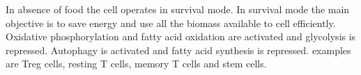 In absence of food the cell operates in survival mode. In survival mode the main objective is to save energy and use all the biomass available to cell efficiently.
Oxidative phosphorylation and fatty acid oxidation are activated and glycolysis is repressed.
Autophagy is activated and fatty acid synthesis is repressed.
examples are Treg cells, resting T cells, memory T cells and stem cells.
